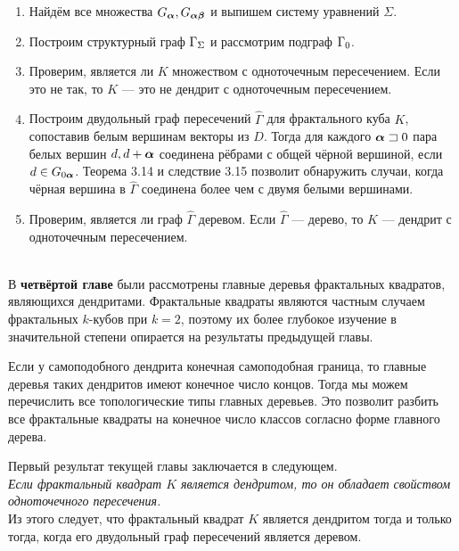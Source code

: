 \documentclass[a5paper,9pt,twoside]{extarticle} %
\begin{document}
\begin{enumerate}[nolistsep]

\item Найдём все множества $G_{\bm{\alpha}}, G_{{\bm{\alpha}}{\bm{\beta}}}$ и выпишем систему уравнений $\Sigma$.

\item Построим структурный граф $\Gamma_\Sigma$ и рассмотрим подграф $\Gamma_0$.
 
\item Проверим, является ли $K$ множеством с одноточечным пересечением.
Если это не так, то $K$ --- это не дендрит с одноточечным пересечением.
    
\item Построим двудольный граф пересечений $\hat\Gamma$ для фрактального куба $K$, сопоставив белым вершинам векторы из $D$.
Тогда для каждого ${\bm{\alpha}}\sqsupset0$ пара белых вершин $d, d+{\bm{\alpha}}$ соединена рёбрами с общей чёрной вершиной, если $d\in G_{0{\bm{\alpha}}}$.
Теорема 3.14 и следствие 3.15 позволит обнаружить случаи, когда чёрная вершина в $\hat\Gamma$ соединена более чем с двумя белыми вершинами.

\item Проверим, является ли граф $\hat\Gamma$ деревом.
Если $\hat\Gamma$ --- дерево, то $K$ --- дендрит с одноточечным пересечением.    
\end{enumerate}\quad\\



В {\bf четвёртой главе} были рассмотрены главные деревья фрактальных квадратов, являющихся дендритами.
Фрактальные квадраты являются частным случаем фрактальных $k$-кубов при $k=2$, поэтому их более глубокое изучение в значительной степени опирается на результаты предыдущей главы.

Если у самоподобного дендрита конечная самоподобная граница, то главные деревья таких дендритов имеют конечное число концов.
Тогда мы можем перечислить все топологические типы главных деревьев.
Это позволит разбить все фрактальные квадраты на конечное число классов согласно форме главного дерева.

Первый результат текущей главы заключается в следующем.\\

{\em Если фрактальный квадрат $K$ является дендритом, то он обладает свойством одноточечного пересечения.}\\

Из этого следует, что фрактальный квадрат $K$ является дендритом тогда и только тогда, когда его двудольный граф пересечений является деревом.\\
 
\end{document}
